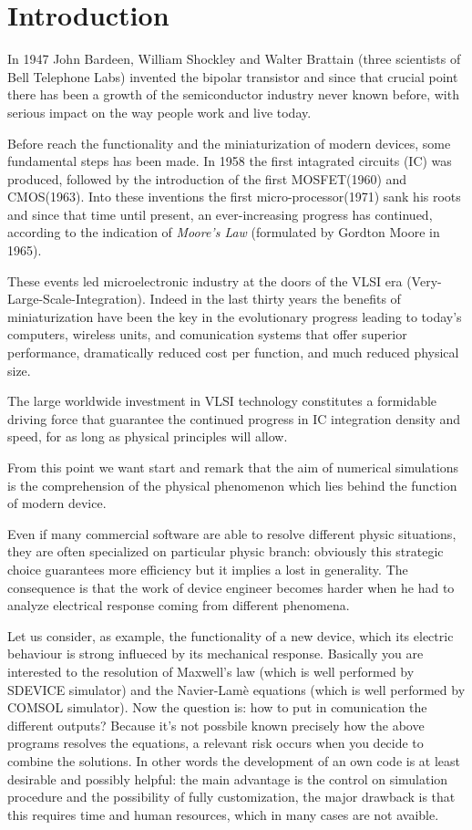 \chapter{Introduction}

In 1947 John Bardeen, William Shockley and Walter Brattain (three scientists of Bell Telephone Labs) invented the bipolar transistor and since that crucial point there has been a growth  of the semiconductor industry never known before, with serious impact on the way people work and live today. 

Before reach the functionality and the miniaturization of modern devices, some fundamental steps has been made.
In 1958 the first intagrated circuits (IC) was produced, followed by the introduction of the first MOSFET(1960) and CMOS(1963). Into these inventions the first micro-processor(1971) sank his roots  and since that time until present, an ever-increasing progress has continued, according to the indication of \textit{Moore's Law} (formulated by Gordton Moore in 1965).

These events led microelectronic industry at the doors of the VLSI era (Very-Large-Scale-Integration). Indeed in the last thirty years the benefits of miniaturization have been the key in the evolutionary progress leading to today's computers, wireless units, and comunication systems that offer superior performance, dramatically reduced cost per function, and much reduced physical size.

The large worldwide investment in VLSI technology constitutes a formidable driving force that guarantee the continued progress in IC integration density and speed, for as long as physical principles will allow.

From this point we want start and remark that the aim of numerical simulations is the comprehension of the physical phenomenon which lies behind the function of modern device. 

Even if many commercial software are able to resolve different physic situations, they are often specialized on particular physic branch: obviously this strategic choice guarantees more efficiency but it implies a lost in generality. The consequence is that the work of device engineer becomes harder when he had to analyze electrical response coming from different phenomena. 

Let us consider, as example, the functionality of a new device, which its electric behaviour is strong influeced by its mechanical response. Basically you are interested to the resolution of Maxwell's law  (which is well performed by SDEVICE simulator) and the Navier-Lam\`e equations (which is well performed by COMSOL simulator). Now the question is: how to put in comunication the different outputs?
Because it's not possbile known precisely how the above programs resolves the equations, a relevant risk occurs when you decide to combine the solutions. 
In other words the development of an own code is at least desirable and possibly helpful: the main advantage is the control on simulation procedure and the possibility of fully customization, the major drawback is that this requires time and human resources, which in many cases are not avaible.   

